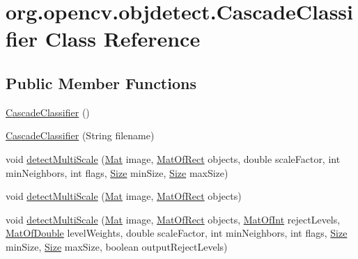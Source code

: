 \hypertarget{classorg_1_1opencv_1_1objdetect_1_1_cascade_classifier}{}\section{org.\+opencv.\+objdetect.\+Cascade\+Classifier Class Reference}
\label{classorg_1_1opencv_1_1objdetect_1_1_cascade_classifier}
\subsection*{Public Member Functions}
\begin{DoxyCompactItemize}
\item 
\mbox{\hyperlink{classorg_1_1opencv_1_1objdetect_1_1_cascade_classifier_a07936214dad18488bc97bfd9dd3fa98d}{Cascade\+Classifier}} ()
\item 
\mbox{\hyperlink{classorg_1_1opencv_1_1objdetect_1_1_cascade_classifier_a5f2b38d9bebf5affc64c7db03abb94ce}{Cascade\+Classifier}} (String filename)
\item 
void \mbox{\hyperlink{classorg_1_1opencv_1_1objdetect_1_1_cascade_classifier_a9973e656c2fd194c81567349bc6be03e}{detect\+Multi\+Scale}} (\mbox{\hyperlink{classorg_1_1opencv_1_1core_1_1_mat}{Mat}} image, \mbox{\hyperlink{classorg_1_1opencv_1_1core_1_1_mat_of_rect}{Mat\+Of\+Rect}} objects, double scale\+Factor, int min\+Neighbors, int flags, \mbox{\hyperlink{classorg_1_1opencv_1_1core_1_1_size}{Size}} min\+Size, \mbox{\hyperlink{classorg_1_1opencv_1_1core_1_1_size}{Size}} max\+Size)
\item 
void \mbox{\hyperlink{classorg_1_1opencv_1_1objdetect_1_1_cascade_classifier_a6eddc10b5daa401fd64d30d51d96795c}{detect\+Multi\+Scale}} (\mbox{\hyperlink{classorg_1_1opencv_1_1core_1_1_mat}{Mat}} image, \mbox{\hyperlink{classorg_1_1opencv_1_1core_1_1_mat_of_rect}{Mat\+Of\+Rect}} objects)
\item 
void \mbox{\hyperlink{classorg_1_1opencv_1_1objdetect_1_1_cascade_classifier_ad40f12ae7e118541479558a2b07e4d01}{detect\+Multi\+Scale}} (\mbox{\hyperlink{classorg_1_1opencv_1_1core_1_1_mat}{Mat}} image, \mbox{\hyperlink{classorg_1_1opencv_1_1core_1_1_mat_of_rect}{Mat\+Of\+Rect}} objects, \mbox{\hyperlink{classorg_1_1opencv_1_1core_1_1_mat_of_int}{Mat\+Of\+Int}} reject\+Levels, \mbox{\hyperlink{classorg_1_1opencv_1_1core_1_1_mat_of_double}{Mat\+Of\+Double}} level\+Weights, double scale\+Factor, int min\+Neighbors, int flags, \mbox{\hyperlink{classorg_1_1opencv_1_1core_1_1_size}{Size}} min\+Size, \mbox{\hyperlink{classorg_1_1opencv_1_1core_1_1_size}{Size}} max\+Size, boolean output\+Reject\+Levels)

\end{DoxyCompactItemize}

